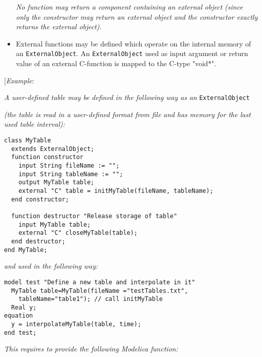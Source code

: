 \begin{itemize}
  \emph{No function may return a component containing an external object
  (since only the constructor may return an external object and the
  constructor exactly returns the external object).}
\item
  External functions may be defined which operate on the internal memory
  of an \lstinline!ExternalObject!. An \lstinline!ExternalObject! used as input argument or
  return value of an external C-function is mapped to the C-type
  "void*".
\end{itemize}

{[}\emph{Example}:

\emph{A user-defined table may be defined in the following way as an}
\lstinline!ExternalObject!

\emph{(the table is read in a user-defined format from file and has
memory for the last used table interval):}

\begin{lstlisting}[language=modelica]
class MyTable
  extends ExternalObject;
  function constructor
    input String fileName := "";
    input String tableName := "";
    output MyTable table;
    external "C" table = initMyTable(fileName, tableName);
  end constructor;

  function destructor "Release storage of table"
    input MyTable table;
    external "C" closeMyTable(table);
  end destructor;
end MyTable;
\end{lstlisting}
\emph{and used in the following way:}

\begin{lstlisting}[language=modelica]
model test "Define a new table and interpolate in it"
  MyTable table=MyTable(fileName ="testTables.txt",
    tableName="table1"); // call initMyTable
  Real y;
equation
  y = interpolateMyTable(table, time);
end test;
\end{lstlisting}
\emph{This requires to provide the following Modelica function:}

